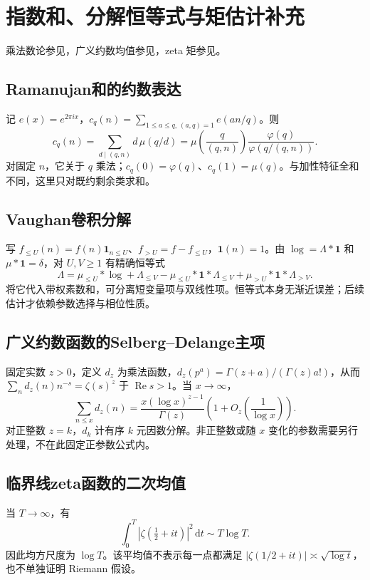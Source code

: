 \documentclass[../main.tex]{subfiles}
\begin{document}
\section{指数和、分解恒等式与矩估计补充}
乘法数论参见\cite{davenport}，广义约数均值参见\cite{tenenbaum}，zeta 矩参见\cite{titchmarsh}。
\subsection{Ramanujan和的约数表达}
记 $e(x)=e^{2\pi ix}$，$c_q(n)=\sum_{1\le a\le q,\,(a,q)=1}e(an/q)$。则
\[
c_q(n)=\sum_{d\mid(q,n)}d\,\mu(q/d)
=\mu\left(\frac q{(q,n)}\right)
\frac{\varphi(q)}{\varphi(q/(q,n))}.
\]
对固定 $n$，它关于 $q$ 乘法；$c_q(0)=\varphi(q)$、$c_q(1)=\mu(q)$。与加性特征全和不同，这里只对既约剩余类求和。
\subsection{Vaughan卷积分解}
写 $f_{\le U}(n)=f(n)\mathbf1_{n\le U}$、$f_{>U}=f-f_{\le U}$，$\mathbf1(n)=1$。由 $\log=\Lambda*\mathbf1$ 和 $\mu*\mathbf1=\delta$，对 $U,V\ge1$ 有精确恒等式
\[
\Lambda=\mu_{\le U}*\log+\Lambda_{\le V}
-\mu_{\le U}*\mathbf1*\Lambda_{\le V}
+\mu_{>U}*\mathbf1*\Lambda_{>V}.
\]
将它代入带权素数和，可分离短变量项与双线性项。恒等式本身无渐近误差；后续估计才依赖参数选择与相位性质。
\subsection{广义约数函数的Selberg--Delange主项}
固定实数 $z>0$，定义 $d_z$ 为乘法函数，$d_z(p^a)=\Gamma(z+a)/(\Gamma(z)a!)$，从而 $\sum_nd_z(n)n^{-s}=\zeta(s)^z$ 于 $\operatorname{Re}s>1$。当 $x\to\infty$，
\[
\sum_{n\le x}d_z(n)=\frac{x(\log x)^{z-1}}{\Gamma(z)}
\left(1+O_z\!\left(\frac1{\log x}\right)\right).
\]
对正整数 $z=k$，$d_k$ 计有序 $k$ 元因数分解。非正整数或随 $x$ 变化的参数需要另行处理，不在此固定正参数公式内。
\subsection{临界线zeta函数的二次均值}
当 $T\to\infty$，有
\[
\int_0^T\left|\zeta\!\left(\tfrac12+it\right)\right|^2\,\mathrm dt
\sim T\log T.
\]
因此均方尺度为 $\log T$。该平均值不表示每一点都满足 $|\zeta(1/2+it)|\asymp\sqrt{\log t}$，也不单独证明 Riemann 假设。
\clearpage
\end{document}
